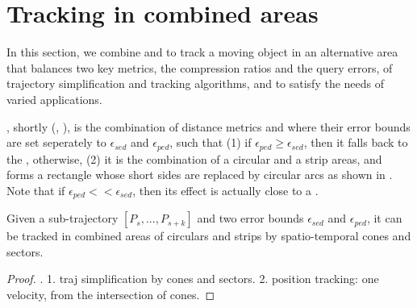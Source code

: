 

\section{Tracking in combined areas}
\label{sec:combine}

In this section, we combine \sed and \ped to track a moving object in an alternative area that balances two key metrics, \ie the compression ratios and the query errors, of trajectory simplification and tracking algorithms, and to satisfy the needs of varied applications.


, shortly \bed (\sed, \ped), is the combination of distance metrics \sed and \ped where their error bounds are set seperately to $\epsilon_{sed}$ and $\epsilon_{ped}$, such that (1) if $\epsilon_{ped} \ge \epsilon_{sed}$, then it falls back to the \sed, otherwise, (2) it is the combination of a circular and a strip areas, and forms a rectangle whose short sides are replaced by circular arcs as shown in . Note that if $\epsilon_{ped} << \epsilon_{sed}$, then its effect is actually close to a \ped.




\begin{theorem}
	\label{theo-binary}
	Given a sub-trajectory $[P_s,...,P_{s+k}]$ and two error bounds $\epsilon_{sed}$ and $\epsilon_{ped}$, it can be tracked in combined areas of circulars and strips by spatio-temporal cones and sectors.
\end{theorem}

\begin{proof}
	\todo.
	1. traj simplification by cones and sectors.
	2. position tracking: one velocity, from the intersection of cones.
\end{proof}




